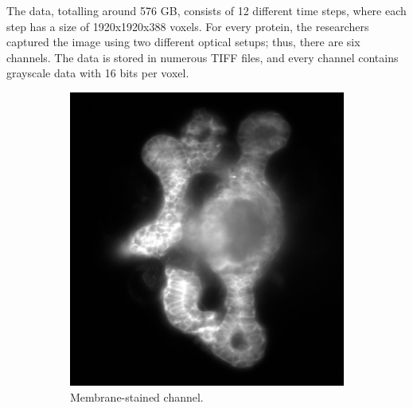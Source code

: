 \documentclass[
  digital,     %
  oneside,     %
  nosansbold,  %
  nocolorbold, %
  lof,         %
  lot,         %
]{fithesis4}
\begin{document}
The data, totalling around 576 GB, consists of 12 different time steps, where
each step has a size of 1920x1920x388 voxels. For every protein, the researchers
captured the image using two different optical setups; thus, there are six
channels. The data is stored in numerous TIFF files, and every channel contains
grayscale data with 16 bits per voxel.
\begin{figure}
    \begin{subfigure}[t]{0.4\textwidth}
        \centering
        \includegraphics[width=\textwidth]{resources/C3-t006-200-scaled.jpg}
        \caption{Membrane-stained channel.}
        \label{fig:data_example_membraine}
    \end{subfigure}
    \begin{subfigure}[t]{0.4\textwidth}
        \centering

\end{subfigure}
\end{figure}
\end{document}
